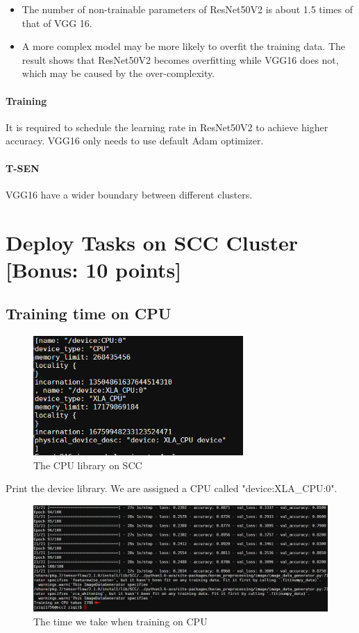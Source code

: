 \documentclass[a4paper,10pt]{article}
\begin{document}
\begin{itemize}
  \item The number of non-trainable parameters of ResNet50V2 is about 1.5 times of that of VGG 16.
  \item A more complex model may be more likely to overfit the training data.
  The result shows that ResNet50V2 becomes overfitting while VGG16 does not, which may be caused by 
  the over-complexity.
\end{itemize}

\paragraph{Training} 
It is required to schedule the learning rate in ResNet50V2 to achieve higher accuracy.
VGG16 only needs to use default Adam optimizer.

\paragraph{T-SEN} VGG16 have a wider boundary between different clusters.


\section{Deploy Tasks on SCC Cluster [Bonus: 10 points]}

\subsection{Training time on CPU}
\begin{figure}[H]
  \centering
  \includegraphics[width=8cm]{./images/CPU-lib.png}
     \caption{The CPU library on SCC}
        \label{CPU-lib}
\end{figure}

Print the device library. We are assigned a CPU called "device:XLA\_CPU:0".

\begin{figure}[H]
  \centering
  \includegraphics[width=15cm]{./images/CPU-Training-time.png}
     \caption{The time we take when training on CPU
             }
        \label{CPU-Training-time}
\end{figure}
\end{document}
